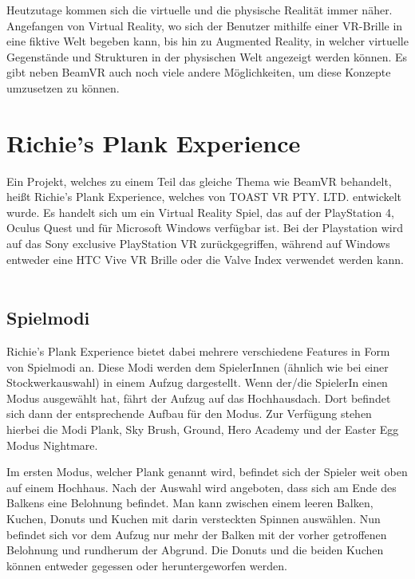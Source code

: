 
%

Heutzutage kommen sich die virtuelle und die physische Realität immer näher.
Angefangen von Virtual Reality, wo sich der Benutzer mithilfe einer VR-Brille in eine fiktive Welt begeben kann,
bis hin zu Augmented Reality, in welcher virtuelle Gegenstände und Strukturen in der physischen Welt angezeigt werden können.
Es gibt neben BeamVR auch noch viele andere M\"oglichkeiten, um diese Konzepte umzusetzen zu können.
\cite{Jabil_FutureOfARVR_2021}


\section{Richie's Plank Experience}
\label{sec:richiesplankexperience}
Ein Projekt, welches zu einem Teil das gleiche Thema wie BeamVR behandelt, heißt Richie's Plank Experience, welches von TOAST VR PTY. LTD. entwickelt wurde.
Es handelt sich um ein Virtual Reality Spiel, das auf der PlayStation 4, Oculus Quest und f\"ur Microsoft Windows verf\"ugbar ist.
Bei der Playstation wird auf das Sony exclusive PlayStation VR zur\"uckgegriffen, während auf Windows entweder eine HTC Vive VR Brille oder die Valve Index verwendet werden kann.
~\cite{ToastGames_2021}

\subsection{Spielmodi}
\label{sec:richiesplankexperience_modes}
Richie's Plank Experience bietet dabei mehrere verschiedene Features in Form von Spielmodi an.
Diese Modi werden dem SpielerInnen (\"ahnlich wie bei einer Stockwerkauswahl) in einem Aufzug dargestellt.
Wenn der/die SpielerIn einen Modus ausgewählt hat, fährt der Aufzug auf das Hochhausdach.
Dort befindet sich dann der entsprechende Aufbau für den Modus.
Zur Verfügung stehen hierbei die Modi Plank, Sky Brush, Ground, Hero Academy und der Easter Egg Modus Nightmare.
~\cite{ToastGames_2021_Steam}

Im ersten Modus, welcher Plank genannt wird, befindet sich der Spieler weit oben auf einem Hochhaus.
Nach der Auswahl wird angeboten, dass sich am Ende des Balkens eine Belohnung befindet.
Man kann zwischen einem leeren Balken, Kuchen, Donuts und Kuchen mit darin versteckten Spinnen auswählen.
Nun befindet sich vor dem Aufzug nur mehr der Balken mit der vorher getroffenen Belohnung und rundherum der Abgrund.
Die Donuts und die beiden Kuchen können entweder gegessen oder heruntergeworfen werden.
~\cite{ToastGames_2021_Steam}

